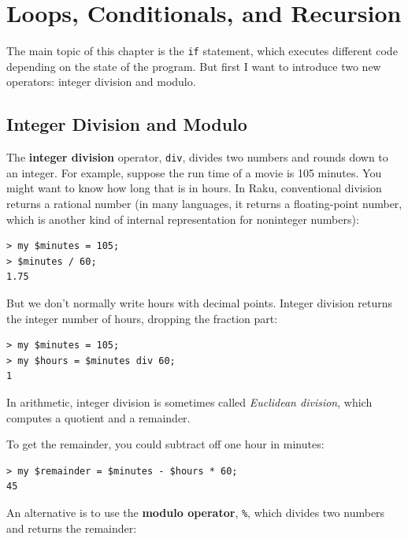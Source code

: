\chapter{Loops, Conditionals, and Recursion}
\label{conditionals}

The main topic of this chapter is the {\tt if} statement, which
executes different code depending on the state of the program.
But first I want to introduce two new operators: integer 
division and modulo.


\section{Integer Division and Modulo}

The {\bf integer division} operator, \verb"div", divides
two numbers and rounds down to an integer.  For example, 
suppose the
run time of a movie is 105 minutes.  You might want to know how
long that is in hours.  In Raku, conventional division
returns a rational number (in many languages, it returns a 
floating-point number, which is another kind of internal 
representation for noninteger numbers):

\begin{verbatim}
> my $minutes = 105;
> $minutes / 60;
1.75
\end{verbatim}

But we don't normally write hours with decimal points.  Integer 
division returns the integer number of hours, dropping the
fraction part:

\begin{verbatim}
> my $minutes = 105;
> my $hours = $minutes div 60;
1
\end{verbatim}

In arithmetic, integer division is sometimes called 
\emph{Euclidean division}, which computes a quotient and a 
remainder.

To get the remainder, you could subtract off one hour in minutes:

\begin{verbatim}
> my $remainder = $minutes - $hours * 60;
45
\end{verbatim}



An alternative is to use the {\bf modulo operator}, \verb"%", which
divides two numbers and returns the remainder:

